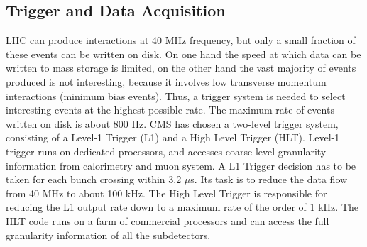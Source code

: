 \subsection*{Trigger and Data Acquisition}
LHC can produce interactions at 40 MHz frequency, but only a small fraction of these
events can be written on disk. On one hand the speed at which data can be written
to mass storage is limited, on the other hand the vast majority of events produced is
not interesting, because it involves low transverse momentum interactions (minimum bias
events). Thus, a trigger system is needed to select interesting events at the highest possible
rate. The maximum rate of events written on disk is about 800 Hz. CMS has chosen a
two-level trigger system, consisting of a Level-1 Trigger (L1)  and a High Level Trigger
(HLT).
Level-1 trigger runs on dedicated processors, and accesses coarse level granularity information 
from calorimetry and muon system. A L1 Trigger decision has to be taken for
each bunch crossing within 3.2 $\mu$s. Its task is to reduce the data flow from 40 MHz to
about 100 kHz. The High Level Trigger is responsible for reducing the L1 output rate down to a maximum
rate of the order of 1 kHz. The HLT code runs on a farm of commercial processors and can access the full granularity information of all the subdetectors.

